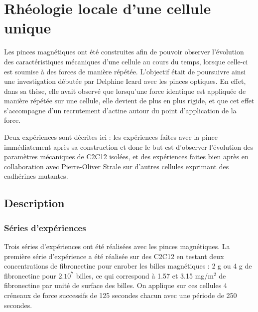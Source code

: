 %
%

\chapter{Rhéologie locale d'une cellule unique}

Les pinces magnétiques ont été construites afin de pouvoir observer l'évolution des caractéristiques mécaniques d'une cellule au cours du temps, lorsque celle-ci est soumise à des forces de manière répétée. L'objectif était de poursuivre ainsi une investigation débutée par Delphine Icard avec les pinces optiques. En effet, dans sa thèse, elle avait observé que lorsqu'une force identique est appliquée de manière répétée sur une cellule, elle devient de plus en plus rigide, et que cet effet s'accompagne d'un recrutement d'actine autour du point d'application de la force. 

Deux expériences sont décrites ici : les expériences faites avec la pince immédiatement après sa construction et donc le but est d'observer l'évolution des paramètres mécaniques de C2C12 isolées, et des expériences faites bien après en collaboration avec Pierre-Oliver Strale sur d'autres cellules exprimant des cadhérines mutantes. 

\section{Description}

\subsection{Séries d'expériences}

Trois séries d'expériences ont été réalisées avec les pinces magnétiques.
La première série d'expérience a été réalisée sur des C2C12 en testant deux concentrations de fibronectine pour enrober les billes magnétiques : 2 \micro g ou  4 \micro g de fibronectine pour $2.10^7$ billes, ce qui correspond à 1.57 et 3.15 mg/m$^2$ de fibronectine par unité de surface des billes. 
On applique sur ces cellules 4 créneaux de force successifs de 125 secondes chacun avec une période de 250 secondes. 

